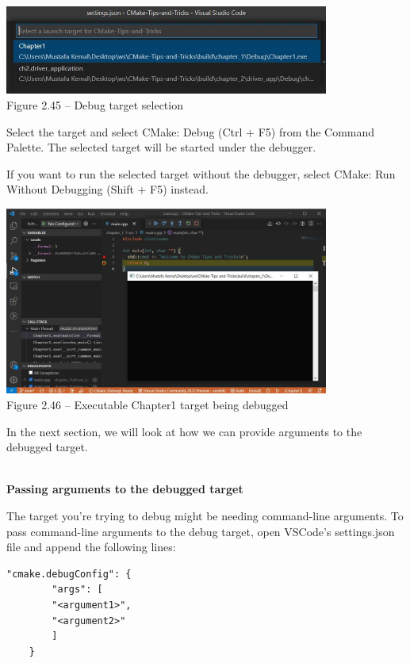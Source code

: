 \begin{center}
\includegraphics[width=0.8\textwidth]{content/1/chapter2/images/45.jpg}\\
Figure 2.45 – Debug target selection
\end{center}

Select the target and select CMake: Debug (Ctrl + F5) from the Command Palette. The selected target will be started under the debugger.

If you want to run the selected target without the debugger, select CMake: Run Without Debugging (Shift + F5) instead.

\begin{center}
\includegraphics[width=0.8\textwidth]{content/1/chapter2/images/46.jpg}\\
Figure 2.46 – Executable Chapter1 target being debugged
\end{center}

In the next section, we will look at how we can provide arguments to the debugged target.

\hspace*{\fill} \\ %
\noindent
\textbf{Passing arguments to the debugged target}

The target you're trying to debug might be needing command-line arguments. To pass command-line arguments to the debug target, open VSCode's settings.json file and append the following lines:

\begin{lstlisting}[style=styleCMake]
"cmake.debugConfig": {
		"args": [
		"<argument1>",
		"<argument2>"
		]
	}
\end{lstlisting}

